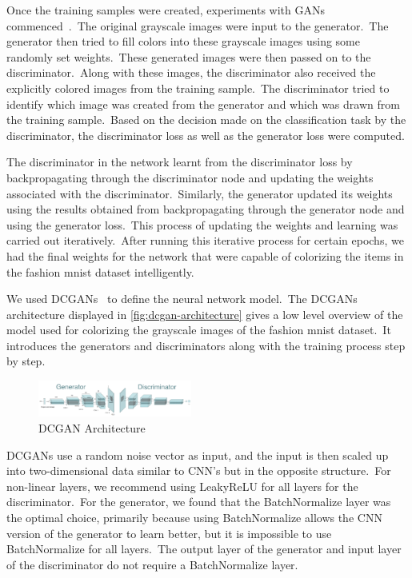 \documentclass[conference]{IEEEtran}
\begin{document}
    Once the training samples were created, experiments with GANs commenced~\cite{coloringimages}.\ The original grayscale images were input to the generator.\ The generator then tried to fill colors into these grayscale images using some randomly set weights.\ These generated images were then passed on to the discriminator.\ Along with these images, the discriminator also received the explicitly colored images from the training sample.\ The discriminator tried to identify which image was created from the generator and which was drawn from the training sample.\ Based on the decision made on the classification task by the discriminator, the discriminator loss as well as the generator loss were computed.

    The discriminator in the network learnt from the discriminator loss by backpropagating through the discriminator node and updating the weights associated with the discriminator.\ Similarly, the generator updated its weights using the results obtained from backpropagating through the generator node and using the generator loss.\ This process of updating the weights and learning was carried out iteratively.\ After running this iterative process for certain epochs, we had the final weights for the network that were capable of colorizing the items in the fashion mnist dataset intelligently.

    We used DCGANs~\cite{dcgans} to define the neural network model.\ The DCGANs architecture displayed in \autoref{fig:dcgan-architecture} gives a low level overview of the model used for colorizing the grayscale images of the fashion mnist dataset.\ It introduces the generators and discriminators along with the training process step by step.

    \begin{figure}
        \caption{DCGAN Architecture}
        \label{fig:dcgan-architecture}
        \includegraphics[width=0.45\textwidth]{architecture.png}
        \centering
    \end{figure}

    DCGANs use a random noise vector as input, and the input is then scaled up into two-dimensional data similar to CNN's but in the opposite structure.\ For non-linear layers, we recommend using LeakyReLU for all layers for the discriminator.\ For the generator, we found that the BatchNormalize layer was the optimal choice, primarily because using BatchNormalize allows the CNN version of the generator to learn better, but it is impossible to use BatchNormalize for all layers.\ The output layer of the generator and input layer of the discriminator do not require a BatchNormalize layer.\
\end{document}
